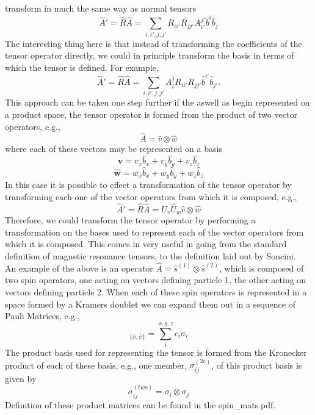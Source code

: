 \documentclass[12pt]{article}
\begin{document}
transform in much the same way as normal tensors
\begin{equation}
\hat{A}' = \hat{R}\hat{A}= \sum_{i,i',j,j'} R_{ii'}R_{jj'}A_{i'}^{j'}\hat{b}^{i}\hat{b}_{j} 
\end{equation}
The interesting thing here is that instead of transforming the coefficients of the tensor operator 
directly, we could in principle transform the basis in terms of which the tensor is defined. For example,
\begin{equation}
\hat{A}' = \hat{R}\hat{A}= \sum_{i,i',j,j'} A_{i}^{j}R_{ii'}R_{jj'} \hat{b}^{i'}\hat{b}_{j'} .
\end{equation}
\noindent This approach can be taken one step further if the aswell as begin represented on 
a product space, the tensor operator is formed from the product of two vector operators, e.g.,
\begin{equation}
\hat{A} = \hat{v}\otimes\hat{w} 
\end{equation}
where each of these vectors may be represented on a basis
\begin{equation}
\mathbf{\hat{v}}  = v_{x}\hat{b}_{x}+v_{y}\hat{b}_{y}+v_{z}\hat{b}_{z}
\end{equation}
\begin{equation}
\mathbf{\hat{w}}  = w_{x}\hat{b}_{x}+w_{y}\hat{b}_{y}+w_{z}\hat{b}_{z}
\end{equation}
In this case it is possible to effect a transformation of the tensor operator by transforming 
each one of the vector operators from which it is composed, e.g.,
\begin{equation}
\hat{A}' = \hat{R}\hat{A}= \hat{U}_{v}
           \hat{U}_{w} \hat{v}\otimes\hat{w}
\end{equation}
Therefore, we could transform the tensor operator by performing a transformation on the
bases used to represent each of the vector operators from which it is composed. This
comes in very useful in going from the standard definition of magnetic resonance tensors, to
the definition laid out by Soncini.\\

\noindent An example of the above is an operator $\hat{A} = \hat{s}^{(1)}\otimes\hat{s}^{(2)}$, 
which is composed of two spin operators, one acting on vectors defining particle 1, the other acting on vectors
defining particle 2. When each of these spin operators is represented in a space formed by a Kramers doublet
we can expand them out in a sequence of Pauli Matrices, e.g.,
\begin{equation}
[\hat{s}_{1}]_{\{\phi, \overline{\phi}\}} = \sum_{i}^{x,y,z} c_{i}\sigma_{i}
\end{equation}
The product basis used for representing the tensor is formed from the Kronecker product of 
each of these basis, e.g., one member, $\sigma^{(2e)}_{ij}$, of this product basis is 
given by
\begin{equation}
\sigma^{(two)}_{ij} = \sigma_{i}\otimes \sigma_{j} 
\end{equation}
Definition of these product matrices can be found in the spin\_mats.pdf.\\
\end{document}
